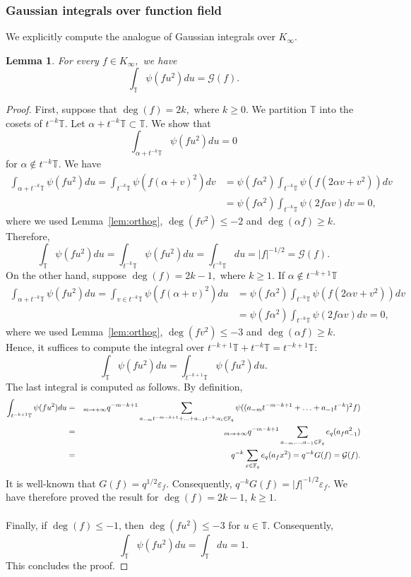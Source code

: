 \documentclass[10pt]{amsart}
\theoremstyle{plain}
\theoremstyle{plain}
\newtheorem{lemma}[theorem]{Lemma}
\theoremstyle{remark}
\theoremstyle{definition}
\let\lim=\relax
\DeclareMathOperator*{\lim}{lim}
\newcommand{\Ki}{K_\infty}
\newcommand{\TT}{\mathbb{T}}
\newcommand{\cG}{\mathcal{G}}
\begin{document}
\subsubsection{Gaussian integrals over function field }
We explicitly compute the analogue of Gaussian integrals over $\Ki$. 
\begin{lemma}\label{ggg} For every $f\in K_{\infty},$
we have 
\[
\int_{\TT} \psi(fu^2) du=\cG(f).
\]

\end{lemma}
\begin{proof}First, suppose that $\deg(f)=2k,$ where $k\geq 0.$ We partition $\TT$ into the cosets of $ t^{-k} \TT.$ Let $\alpha + t^{-k} \TT \subset \TT.$ We show that 
\[
\int_{\alpha + t^{-k} \TT} \psi(fu^2) du= 0
\]
for $\alpha \notin t^{-k} \TT.$ We have 
\begin{equation*}
\begin{split}
\int_{\alpha + t^{-k} \TT} \psi(fu^2) du= \int_{t^{-k} \TT} \psi(f(\alpha +v)^2) dv
&=\psi(f\alpha^2 )\int_{t^{-k} \TT} \psi(f(2\alpha v +v^2)) dv
\\
&=\psi(f\alpha^2 )\int_{t^{-k} \TT} \psi(2f\alpha v ) dv=0,
\end{split}
\end{equation*}
where we used Lemma~\ref{lem:orthog}, $\deg(fv^2)\leq -2$ and $\deg(\alpha f )\geq k.$ Therefore, 
\[
\int_{\TT} \psi(fu^2) du=\int_{ t^{-k} \TT} \psi(fu^2) du=\int_{ t^{-k} \TT}  du =|f|^{-1/2}=\mathcal{G}(f).
\]
On the other hand, suppose $\deg(f)=2k-1,$ where $k\geq 1.$ If $\alpha \notin t^{-k+1} \TT$ 
\begin{equation*}
\begin{split}
\int_{\alpha + t^{-k} \TT} \psi(fu^2) du= \int_{v\in t^{-k} \TT} \psi(f(\alpha +v)^2) du
&=\psi(f\alpha^2 )\int_{ t^{-k} \TT} \psi(f(2\alpha v +v^2)) dv
\\
&=\psi(f\alpha^2 )\int_{t^{-k} \TT} \psi(2f\alpha v ) dv=0,
\end{split}
\end{equation*}
where we used Lemma~\ref{lem:orthog}, $\deg(fv^2)\leq -3$ and $\deg(\alpha f )\geq k.$ Hence, it suffices to compute the integral over $t^{-k+1}\TT+t^{-k}\TT=t^{-k+1}\TT$:
\[
\int_{\TT} \psi(fu^2) du=\int_{ t^{-k+1}\TT} \psi(fu^2) du.
\]
The last integral is computed as follows. By definition,
\begin{eqnarray*}
\int_{t^{-k+1}\TT} \psi(fu^2) du&=& \lim_{m\rightarrow +\infty}q^{-m-k+1}\sum_{a_{-m}t^{-m-k+1}+\hdots+a_{-1}t^{-k}:a_i\in\mathbb{F}_q}\psi((a_{-m}t^{-m-k+1}+\hdots+a_{-1}t^{-k})^2f)\\&=& \lim_{m\rightarrow +\infty}q^{-m-k+1}\sum_{a_{-m},\hdots,a_{-1}\in\mathbb{F}_q}e_q(a_fa_{-1}^2)\\ &=& q^{-k}\sum_{x\in\mathbb{F}_q}e_q(a_fx^2)=q^{-k}G(f)=\mathcal{G}(f).
\end{eqnarray*}
It is well-known that $G(f)=q^{1/2}\varepsilon_f$. Consequently, $q^{-k}G(f)=|f|^{-1/2}\varepsilon_f$. We have therefore proved the result for $\deg(f)=2k-1$, $k\geq 1$. \\
\\
Finally, if $\deg(f)\leq -1$, then $\deg(fu^2)\leq -3$ for $u\in\mathbb{T}$. Consequently,
\[\int_{\TT}\psi(fu^2)du=\int_{\TT}du=1.\] 
This concludes the proof.
\end{proof}
\end{document}

